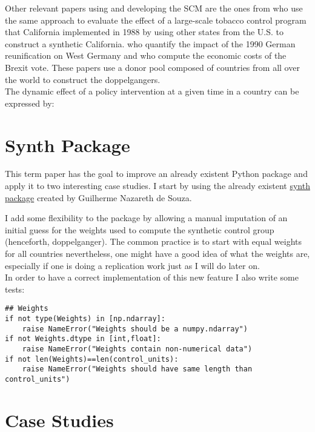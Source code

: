 \documentclass[11pt, a4paper, leqno]{article}
\begin{document}
Other relevant papers using and developing the SCM are the ones from \citet{Abadie2010} who use the same approach to evaluate the effect of a large-scale tobacco control program that California implemented in 1988 by using other states from the U.S. to construct a synthetic California. \citet{Abadie2015} who quantify the impact of the 1990 German reunification on West Germany and \citet{Born2018} who compute the economic costs of the Brexit vote. These papers use a donor pool composed of countries from all over the world to construct the doppelgangers. \\



The dynamic effect of a policy intervention at a given time in a country can be expressed by: 


\section{Synth Package} %
\label{synth}

This term paper has the goal to improve an already existent Python package and apply it to two interesting case studies. I start by using the already existent \href{https://github.com/gnazareths/synth}{synth package} created by Guilherme Nazareth de Souza. 




I add some flexibility to the package by allowing a manual imputation of an initial guess for the weights used to compute the synthetic control group (henceforth, doppelganger). The common practice is to start with equal weights for all countries nevertheless, one might have a good idea of what the weights are, especially if one is doing a replication work just as I will do later on.\\

In order to have a correct implementation of this new feature I also write some tests: 
\begin{lstlisting}
## Weights
if not type(Weights) in [np.ndarray]:
    raise NameError("Weights should be a numpy.ndarray")
if not Weights.dtype in [int,float]:
    raise NameError("Weights contain non-numerical data")
if not len(Weights)==len(control_units):
    raise NameError("Weights should have same length than control_units")
\end{lstlisting}



\section{Case Studies}
\end{document}
